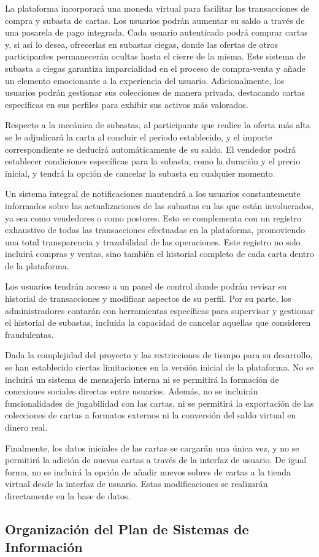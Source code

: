 La plataforma incorporará una moneda virtual para facilitar las transacciones de compra y subasta de cartas. Los usuarios podrán aumentar su saldo a través de una pasarela de pago integrada. 
Cada usuario autenticado podrá comprar cartas y, si así lo desea, ofrecerlas en subastas ciegas, donde las ofertas de otros participantes permanecerán ocultas hasta el cierre de la misma. 
Este sistema de subasta a ciegas garantiza imparcialidad en el proceso de compra-venta y añade un elemento emocionante a la experiencia del usuario. 
Adicionalmente, los usuarios podrán gestionar sus colecciones de manera privada, destacando cartas específicas en sus perfiles para exhibir sus activos más valorados.


Respecto a la mecánica de subastas, al participante que realice la oferta más alta se le adjudicará la carta al concluir el periodo establecido, y el importe correspondiente se deducirá 
automáticamente de su saldo. El vendedor podrá establecer condiciones específicas para la subasta, como la duración y el precio inicial, y 
tendrá la opción de cancelar la subasta en cualquier momento.


Un sistema integral de notificaciones mantendrá a los usuarios constantemente informados sobre las actualizaciones de las subastas en las que están involucrados, 
ya sea como vendedores o como postores. Esto se complementa con un registro exhaustivo de todas las transacciones efectuadas en la plataforma, promoviendo una total transparencia y trazabilidad 
de las operaciones. Este registro no solo incluirá compras y ventas, sino también el historial completo de cada carta dentro de la plataforma.


Los usuarios tendrán acceso a un panel de control donde podrán revisar su historial de transacciones y modificar aspectos de su perfil. 
Por su parte, los administradores contarán con herramientas específicas para supervisar y gestionar el historial de subastas, incluida la capacidad de cancelar aquellas que consideren fraudulentas.


Dada la complejidad del proyecto y las restricciones de tiempo para su desarrollo, se han establecido ciertas limitaciones en la versión inicial de la plataforma.
No se incluirá un sistema de mensajería interna ni se permitirá la formación de conexiones sociales directas entre usuarios. 
Además, no se incluirán funcionalidades de jugabilidad con las cartas, ni se permitirá la exportación de las colecciones de cartas a formatos externos ni la conversión del saldo virtual en dinero real.


Finalmente, los datos iniciales de las cartas se cargarán una única vez, y no se permitirá la adición de nuevas cartas a través de la interfaz de usuario. 
De igual forma, no se incluirá la opción de añadir nuevos sobres de cartas a la tienda virtual desde la interfaz de usuario. Estas modificaciones se realizarán directamente en la base de datos.


\subsection{Organización del Plan de Sistemas de Información }

